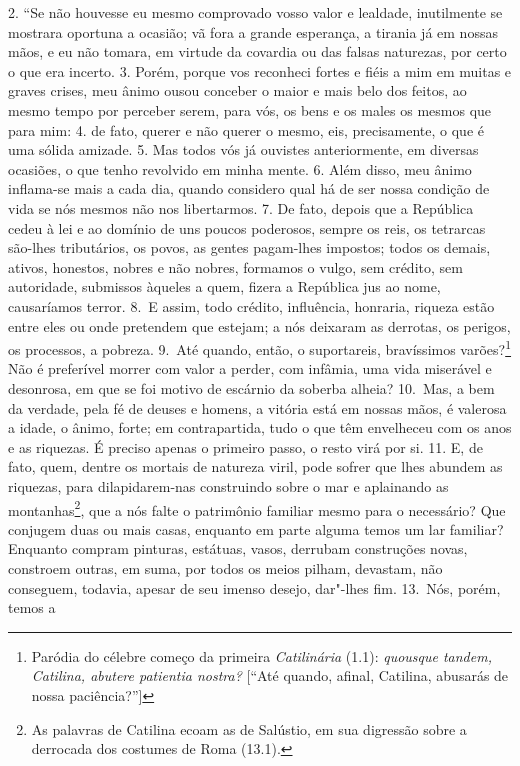 2. “Se não houvesse eu mesmo comprovado vosso valor e lealdade, inutilmente se
mostrara oportuna a ocasião; vã fora a grande esperança, a tirania já em nossas
mãos, e eu não tomara, em virtude da covardia ou das falsas naturezas, por
certo o que era incerto. 3. Porém, porque vos reconheci fortes e fiéis a mim em
muitas e graves crises, meu ânimo ousou conceber o maior e mais belo dos
feitos, ao mesmo tempo por perceber serem, para vós, os bens e os males os
mesmos que para mim: 4. de fato, querer e não querer o mesmo, eis,
precisamente, o que é uma sólida amizade. 5. Mas todos vós já ouvistes
anteriormente, em diversas ocasiões, o que tenho revolvido em minha mente. 6.
Além disso, meu ânimo inflama-se mais a cada dia, quando considero qual há de
ser nossa condição de vida se nós mesmos não nos libertarmos. 7. De fato,
depois que a República cedeu à lei e ao domínio de uns poucos poderosos, sempre
os reis, os tetrarcas são-lhes tributários, os povos, as gentes pagam-lhes
impostos; todos os demais, ativos, honestos, nobres e não nobres, formamos o
vulgo, sem crédito, sem autoridade, submissos àqueles a quem, fizera a
República jus ao nome, causaríamos terror. 8.~E assim, todo crédito,
influência, honraria, riqueza estão entre eles ou onde pretendem que estejam; a
nós deixaram as derrotas, os perigos, os processos, a pobreza. 9.~Até quando,
então, o suportareis, bravíssimos varões?\footnote{Paródia do célebre começo da
primeira \emph{Catilinária} (1.1): \emph{quousque tandem, Catilina, abutere
patientia nostra?} [``Até quando, afinal, Catilina, abusarás de nossa
paciência?'']} Não é preferível morrer com valor a perder, com infâmia, uma
vida miserável e desonrosa, em que se foi motivo de escárnio da soberba alheia?
10.~Mas, a bem da verdade, pela fé de deuses e homens, a vitória está em nossas
mãos, é valerosa a idade, o ânimo, forte; em contrapartida, tudo o que têm
envelheceu com os anos e as riquezas. É preciso apenas o primeiro passo, o
resto virá por si. 11. E, de fato, quem, dentre os mortais de natureza viril,
pode sofrer que lhes abundem as riquezas, para dilapidarem-nas construindo
sobre o mar e aplainando as montanhas\footnote{As palavras de Catilina ecoam as
de Salústio, em sua digressão sobre a derrocada dos costumes de Roma (13.1).}, que a nós falte o patrimônio familiar mesmo para o necessário? Que
conjugem duas ou mais casas, enquanto em parte alguma temos um lar familiar?
Enquanto compram pinturas, estátuas, vasos, derrubam construções novas,
constroem outras, em suma, por todos os meios pilham, devastam, não conseguem,
todavia, apesar de seu imenso desejo, dar"-lhes fim. 13.~Nós, porém, temos a
